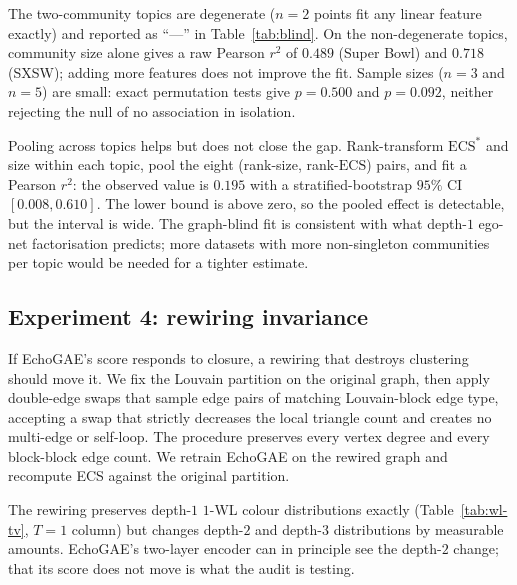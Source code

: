 \documentclass[letterpaper]{article} %
\begin{document}
The two-community topics are degenerate ($n = 2$ points fit
any linear feature exactly) and reported as ``---'' in
Table~\ref{tab:blind}. On the non-degenerate topics, community size alone gives a raw
Pearson $r^2$ of $0.489$ (Super Bowl) and $0.718$ (SXSW); adding
more features does not improve the fit. Sample sizes ($n = 3$
and $n = 5$) are small: exact permutation tests give $p = 0.500$
and $p = 0.092$, neither rejecting the null of no association
in isolation.

Pooling across topics helps but does not close the gap.
Rank-transform $\mathrm{ECS}^*$ and size within each topic, pool
the eight (rank-size, rank-$\mathrm{ECS}$) pairs, and fit a
Pearson $r^2$: the observed value is $0.195$ with a
stratified-bootstrap $95\%$ CI $[0.008, 0.610]$. The lower bound
is above zero, so the pooled effect is detectable, but the
interval is wide. The graph-blind fit is consistent with what
depth-$1$ ego-net factorisation predicts; more datasets with
more non-singleton communities per topic would be needed for a
tighter estimate.

\subsection{Experiment 4: rewiring invariance}\label{sec:exp-rewire}

If EchoGAE's score responds to closure, a rewiring that destroys
clustering should move it. We fix the Louvain partition on the
original graph, then apply double-edge swaps that sample edge
pairs of matching Louvain-block edge type, accepting a swap that
strictly decreases the local triangle count and creates no
multi-edge or self-loop. The procedure preserves every vertex
degree and every block-block edge count. We retrain EchoGAE on
the rewired graph and recompute ECS against the original
partition.

The rewiring preserves depth-$1$ $1$-WL colour distributions
exactly (Table~\ref{tab:wl-tv}, $T = 1$ column) but changes
depth-$2$ and depth-$3$ distributions by measurable amounts.
EchoGAE's two-layer encoder can in principle see the depth-$2$
change; that its score does not move is what the audit is
testing.
\end{document}
